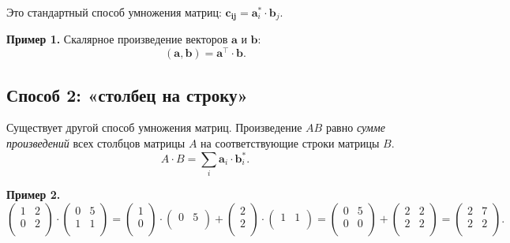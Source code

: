\documentclass[11pt,a4paper]{article}
\begin{document}
Это стандартный способ умножения матриц:
\(\mathbf{c_{ij}} = \mathbf{a}_i^* \cdot \mathbf{b}_j\).

\textbf{Пример 1.} Скалярное произведение векторов \(\mathbf{a}\) и
\(\mathbf{b}\):
\[ (\mathbf{a}, \mathbf{b}) = \mathbf{a}^\top \cdot \mathbf{b}. \]

    \hypertarget{ux441ux43fux43eux441ux43eux431-2-ux441ux442ux43eux43bux431ux435ux446-ux43dux430-ux441ux442ux440ux43eux43aux443}{%
\subsection{Способ 2: «столбец на
строку»}\label{ux441ux43fux43eux441ux43eux431-2-ux441ux442ux43eux43bux431ux435ux446-ux43dux430-ux441ux442ux440ux43eux43aux443}}

Существует другой способ умножения матриц. Произведение \(AB\) равно
\emph{сумме произведений} всех столбцов матрицы \(A\) на соответствующие
строки матрицы \(B\).
\[ A \cdot B = \sum_i \mathbf{a}_i \cdot \mathbf{b}_i^*. \]

\textbf{Пример 2.} \[
  \begin{pmatrix}
     1 & 2 \\
     0 & 2 \\
  \end{pmatrix}
  \cdot
  \begin{pmatrix}
     0 & 5 \\
     1 & 1 \\
  \end{pmatrix}
  =
  \begin{pmatrix}
     1 \\
     0 \\
  \end{pmatrix}
  \cdot
  \begin{pmatrix}
     0 & 5 \\
  \end{pmatrix}
  +
  \begin{pmatrix}
     2 \\
     2 \\
  \end{pmatrix}
  \cdot
  \begin{pmatrix}
     1 & 1 \\
  \end{pmatrix}
  =
  \begin{pmatrix}
     0 & 5 \\
     0 & 0 \\
  \end{pmatrix}
  +
  \begin{pmatrix}
     2 & 2 \\
     2 & 2 \\
  \end{pmatrix}
  =
  \begin{pmatrix}
     2 & 7 \\
     2 & 2 \\
  \end{pmatrix}.
\]
\end{document}
